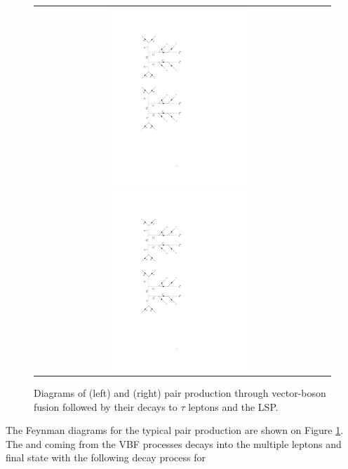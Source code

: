 \begin{figure}[tbh!]
	\centering
	\begin{tabular}{cc}
		\includegraphics[width=0.50\textwidth]{diagrams/pics/signal_C1N2.pdf}
		\includegraphics[width=0.50\textwidth]{diagrams/pics/signal_C1C1.pdf} 		
	\end{tabular}
	\caption{Diagrams of (left) \charginopm \neutralinotwo and (right) \charginopm \charginomp pair production through vector-boson fusion followed by their decays to $\tau$ leptons and the LSP.}
	\label{fig:VBF_diagrams}
\end{figure}

The Feynman diagrams for the typical \charginopm \neutralinotwo pair production are shown on  Figure \ref{fig:VBF_diagrams}. The \charginopm and \neutralinotwo coming from the VBF processes decays into the multiple leptons and \neutralinoone final state with the following decay process for \charginopm

